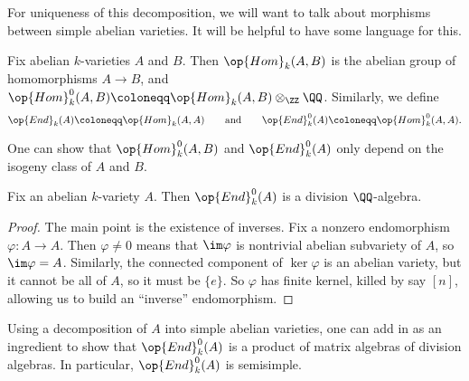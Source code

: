 \documentclass[../notes.tex]{subfiles}
\begin{document}
For uniqueness of this decomposition, we will want to talk about morphisms between simple abelian varieties. It will be helpful to have some language for this.
\begin{definition}
	Fix abelian $k$-varieties $A$ and $B$. Then $\op{Hom}_k(A,B)$ is the abelian group of homomorphisms $A\to B$, and $\op{Hom}_k^0(A,B)\coloneqq\op{Hom}_k(A,B)\otimes_\ZZ\QQ$. Similarly, we define
	\[\op{End}_k(A)\coloneqq\op{Hom}_k(A,A)\qquad\text{and}\qquad\op{End}^0_k(A)\coloneqq\op{Hom}_k^0(A,A).\]
\end{definition}
\begin{remark}
	One can show that $\op{Hom}^0_k(A,B)$ and $\op{End}^0_k(A)$ only depend on the isogeny class of $A$ and $B$.
\end{remark}
\begin{corollary} \label{cor:end-a}
	Fix an abelian $k$-variety $A$. Then $\op{End}^0_k(A)$ is a division $\QQ$-algebra.
\end{corollary}
\begin{proof}
	The main point is the existence of inverses. Fix a nonzero endomorphism $\varphi\colon A\to A$. Then $\varphi\ne0$ means that $\im\varphi$ is nontrivial abelian subvariety of $A$, so $\im\varphi=A$. Similarly, the connected component of $\ker\varphi$ is an abelian variety, but it cannot be all of $A$, so it must be $\{e\}$. So $\varphi$ has finite kernel, killed by say $[n]$, allowing us to build an ``inverse'' endomorphism.
\end{proof}
\begin{remark}
	Using a decomposition of $A$ into simple abelian varieties, one can add in  as an ingredient to show that $\op{End}^0_k(A)$ is a product of matrix algebras of division algebras. In particular, $\op{End}^0_k(A)$ is semisimple.
\end{remark}
\end{document}
